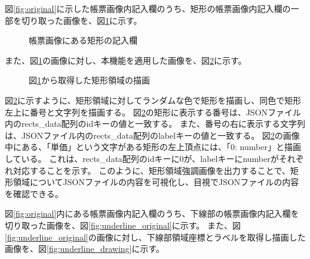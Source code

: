 図\ref{fig:original}に示した帳票画像内記入欄のうち、矩形の帳票画像内記入欄の一部を切り取った画像を、図\ref{fig:rect_original}に示す。
\begin{figure}[tp]
    \begin{center}
        \caption{帳票画像にある矩形の記入欄}
        \label{fig:rect_original}
    \end{center}
\end{figure}
また、図\ref{fig:rect_original}の画像に対し、本機能を適用した画像を、図\ref{fig:rect_drawing}に示す。
\begin{figure}[tp]
    \begin{center}
        \caption{図\ref{fig:rect_original}から取得した矩形領域の描画}
        \label{fig:rect_drawing}
    \end{center}
\end{figure}
図\ref{fig:rect_drawing}に示すように、矩形領域に対してランダムな色で矩形を描画し、同色で矩形左上に番号と文字列を描画する。
図\ref{fig:rect_drawing}の矩形に表示する番号は、JSONファイル内のrects\_data配列のidキーの値と一致する。
また、番号の右に表示する文字列は、JSONファイル内のrects\_data配列のlabelキーの値と一致する。
図\ref{fig:rect_drawing}の画像中にある、「単価」という文字がある矩形の左上頂点には、「0: number」と描画している。
これは、rects\_data配列のidキーに0が、labelキーにnumberがそれぞれ対応することを示す。
このように、矩形領域強調画像を出力することで、矩形領域についてJSONファイルの内容を可視化し、目視でJSONファイルの内容を確認できる。

図\ref{fig:original}内にある帳票画像内記入欄のうち、下線部の帳票画像内記入欄を切り取った画像を、図\ref{fig:underline_original}に示す。
また、図\ref{fig:underline_original}の画像に対し、下線部領域座標とラベルを取得し描画した画像を、図\ref{fig:underline_drawing}に示す。

